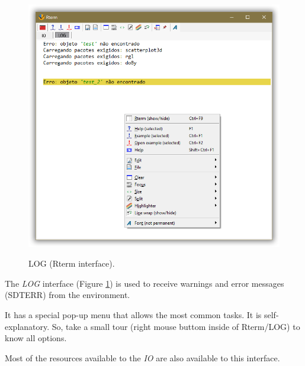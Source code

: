  \begin{figure}[H]
  \includegraphics[scale=0.35]{./res/rterm_log.png}\\
  \caption{LOG (Rterm interface).}
  \label{fig:rterm_log}
\end{figure}

The \textit{LOG} interface
(Figure \ref{fig:rterm_log})
is used to receive warnings and error messages (SDTERR) from the \RR{} environment.

It has a special pop-up menu that allows the most common tasks. It is
self-explanatory. So, take a small tour (right mouse buttom inside of
Rterm/LOG) to know all options.

Most of the resources available to the \textit{IO} are also available to this
interface.
